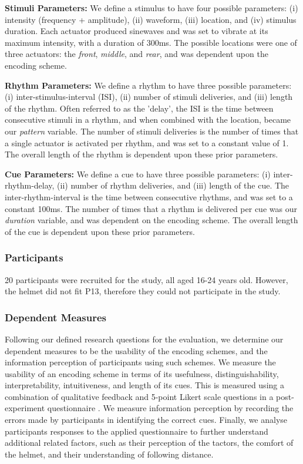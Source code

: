 \documentclass{mpaper}
\begin{document}
\textbf{Stimuli Parameters:} We define a stimulus to have four possible parameters: (i) intensity (frequency + amplitude), (ii) waveform, (iii) location, and (iv) stimulus duration. Each actuator produced sinewaves and was set to vibrate at its maximum intensity, with a duration of 300ms. The possible locations were one of three actuators: the \textit{front}, \textit{middle}, and \textit{rear}, and was dependent upon the encoding scheme.

\textbf{Rhythm Parameters:} We define a rhythm to have three possible parameters: (i) inter-stimulus-interval (ISI), (ii) number of stimuli deliveries, and (iii) length of the rhythm. Often referred to as the 'delay', the ISI is the time between consecutive stimuli in a rhythm, and when combined with the location, became our \textit{pattern} variable. The number of stimuli deliveries is the number of times that a single actuator is activated per rhythm, and was set to a constant value of 1. The overall length of the rhythm is dependent upon these prior parameters.

\textbf{Cue Parameters:} We define a cue to have three possible parameters: (i) inter-rhythm-delay, (ii) number of rhythm deliveries, and (iii) length of the cue. The inter-rhythm-interval is the time between consecutive rhythms, and was set to a constant 100ms. The number of times that a rhythm is delivered per cue was our \textit{duration} variable, and was dependent on the encoding scheme. The overall length of the cue is dependent upon these prior parameters.


\subsubsection{Participants}
20 participants were recruited for the study, all aged 16-24 years old. However, the helmet did not fit P13, therefore they could not participate in the study.


\subsubsection{Dependent Measures}
Following our defined research questions for the evaluation, we determine our dependent measures to be the usability of the encoding schemes, and the information perception of participants using such schemes. We measure the usability of an encoding scheme in terms of its usefulness, distinguishability, interpretability, intuitiveness, and length of its cues. This is measured using a combination of qualitative feedback and 5-point Likert scale questions in a post-experiment questionnaire \cite{joshi2015likert}. We measure information perception by recording the errors made by participants in identifying the correct cues. Finally, we analyse participants responses to the applied questionnaire to further understand additional related factors, such as their perception of the tactors, the comfort of the helmet, and their understanding of following distance.
\end{document}
